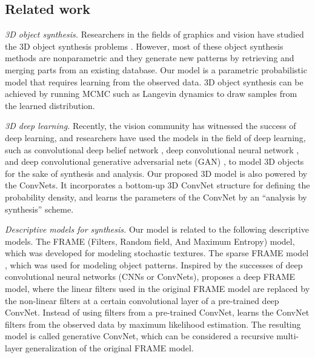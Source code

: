 \documentclass[10pt,twocolumn,letterpaper]{article}
\begin{document}
\subsection{Related work}

\textit{3D object synthesis.} Researchers in the fields of graphics and vision have studied the 3D object synthesis problems \cite{blanz1999morphable, carlson1982algorithm, kalogerakis2012probabilistic}. However, most of these object synthesis methods are nonparametric and they generate new patterns by retrieving and merging parts from an existing database. Our model is a parametric probabilistic model that requires learning from the observed data.  3D object synthesis can be achieved by running MCMC such as Langevin dynamics to draw samples from the learned distribution.

\textit{3D deep learning.} Recently, the vision community has witnessed the success of deep learning, and  researchers have used  the models in the field of deep learning, such as convolutional deep belief network \cite{wu20153d}, deep convolutional neural network \cite{maturana2015voxnet}, and deep convolutional generative adversarial nets (GAN) \cite{3dgan}, to model 3D objects for the sake of synthesis and analysis. Our proposed 3D model is also powered by the ConvNets. It incorporates a bottom-up 3D ConvNet structure for defining the probability density, and learns the parameters of the ConvNet by an ``analysis by synthesis'' scheme.   

\textit{Descriptive models for synthesis.} 
Our model is related to the following descriptive models. The FRAME (Filters, Random field, And Maximum Entropy) \cite{zhu1998filters} model, which was developed for modeling  stochastic textures. The sparse FRAME model \cite{xie2015learning, xie2016inducing}, which was used for modeling object patterns. 
Inspired by the successes of deep convolutional neural networks (CNNs or ConvNets), \cite{lu2015learning} proposes a deep FRAME model, where the linear filters used in the original FRAME model are replaced by the non-linear filters at a certain convolutional layer of a pre-trained deep ConvNet. %
Instead of using filters from a pre-trained ConvNet, \cite{XieLuICML} learns the ConvNet filters from the observed data by maximum likelihood estimation. The resulting model is called generative ConvNet, which can be considered a recursive multi-layer generalization of the original FRAME model. 
\end{document}
